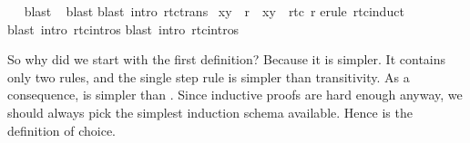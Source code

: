 \begin{isabellebody}
\ \ \isamarkupfalse%
{}blast{}\isanewline
\ \isamarkupfalse%
{}blast{}\isanewline
{}\isamarkupfalse%
{}blast\ intro{}\ rtc{}trans{}\isanewline
{}\isamarkupfalse%
%
\endisatagproof
{\isafoldproof}%
%
\isadelimproof
\isanewline
%
\endisadelimproof
\isanewline
{}\isamarkupfalse%
\ {}{}x{}y{}\ {}\ r{}\ {}\ {}x{}y{}\ {}\ rtc{}\ r{}\isanewline
%
\isadelimproof
%
\endisadelimproof
%
\isatagproof
{}\isamarkupfalse%
{}erule\ rtc{}induct{}\isanewline
\ \isamarkupfalse%
{}blast\ intro{}\ rtc{}{}intros{}\isanewline
{}\isamarkupfalse%
{}blast\ intro{}\ rtc{}{}intros{}\isanewline
{}\isamarkupfalse%
%
\endisatagproof
{\isafoldproof}%
%
\isadelimproof
%
\endisadelimproof
%
\begin{isamarkuptext}%
So why did we start with the first definition? Because it is simpler. It
contains only two rules, and the single step rule is simpler than
transitivity.  As a consequence,  is simpler than
. Since inductive proofs are hard enough
anyway, we should always pick the simplest induction schema available.
Hence  is the definition of choice.


\end{isamarkuptext}
\end{isabellebody}
